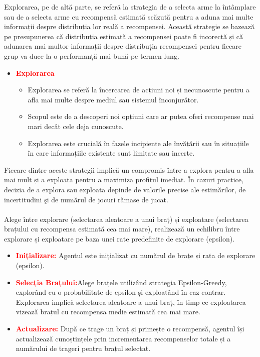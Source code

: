 \documentclass{article}
\begin{document}
Explorarea, pe de altă parte, se referă la strategia de a selecta arme la întâmplare sau de a selecta arme cu recompensă estimată scăzută pentru a aduna mai multe informații despre distribuția lor reală a recompensei. Această strategie se bazează pe presupunerea că distribuția estimată a recompensei poate fi incorectă și că adunarea mai multor informații despre distribuția recompensei pentru fiecare grup va duce la o performanță mai bună pe termen lung.
\begin{itemize}
 \item \textbf{\textcolor{red}{Explorarea}} 
    \begin{itemize}
        \item Explorarea se referă la încercarea de acțiuni noi și necunoscute pentru a afla mai multe despre mediul sau sistemul înconjurător.
        \item Scopul este de a descoperi noi opțiuni care ar putea oferi recompense mai mari decât cele deja cunoscute.
        \item Explorarea este crucială în fazele incipiente ale învățării sau în situațiile în care informațiile existente sunt limitate sau incerte.
    \end{itemize}
\end{itemize}
Fiecare dintre aceste strategii implică un compromis între a explora pentru a afla mai mult și a exploata pentru a maximiza profitul imediat. În cazuri practice, decizia de a explora sau exploata depinde de valorile precise ale estimărilor, de incertitudini şi de numărul de jocuri rămase de jucat.\\\\
Alege între explorare (selectarea aleatoare a unui braț) și exploatare (selectarea brațului cu recompensa estimată cea mai mare), realizează un echilibru între explorare și exploatare pe baza unei rate predefinite de explorare (epsilon).
\begin{itemize}
        \item\textbf{\textcolor{red}{Inițializare:}} Agentul este inițializat cu numărul de brațe și rata de explorare (epsilon).
        \item\textbf{\textcolor{red}{Selecția Brațului:}}Alege brațele utilizând strategia Epsilon-Greedy, explorând cu o probabilitate de epsilon și exploatând în caz contrar. Explorarea implică selectarea aleatoare a unui braț, în timp ce exploatarea vizează brațul cu recompensa medie estimată cea mai mare.
        \item\textbf{\textcolor{red}{Actualizare:}} După ce trage un braț și primește o recompensă, agentul își actualizează cunoștințele prin incrementarea recompenselor totale și a numărului de trageri pentru brațul selectat.
\end{itemize}
\end{document}
